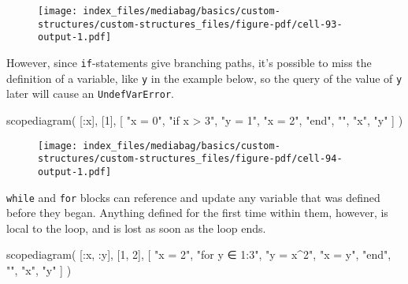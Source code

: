 \documentclass[
  letterpaper,
  DIV=11,
  numbers=noendperiod]{scrreprt}
\newenvironment{Shaded}{\begin{snugshade}}{\end{snugshade}}
\newcommand{\FloatTok}[1]{\textcolor[rgb]{0.68,0.00,0.00}{#1}}
\newcommand{\FunctionTok}[1]{\textcolor[rgb]{0.28,0.35,0.67}{#1}}
\newcommand{\NormalTok}[1]{\textcolor[rgb]{0.00,0.23,0.31}{#1}}
\newcommand{\OperatorTok}[1]{\textcolor[rgb]{0.37,0.37,0.37}{#1}}
\newcommand{\StringTok}[1]{\textcolor[rgb]{0.13,0.47,0.30}{#1}}
\begin{document}
\begin{figure}[H]

{\centering \texttt{[image: index\_files/mediabag/basics/custom-structures/custom-structures\_files/figure-pdf/cell-93-output-1.pdf]}

}

\end{figure}

However, since \texttt{if}-statements give branching paths, it's
possible to miss the definition of a variable, like \texttt{y} in the
example below, so the query of the value of \texttt{y} later will cause
an \texttt{UndefVarError}.

\begin{Shaded}
\begin{Highlighting}[]
\FunctionTok{scopediagram}\NormalTok{(}
\NormalTok{    [}\OperatorTok{:}\NormalTok{x], [}\FloatTok{1}\NormalTok{],}
\NormalTok{    [}
        \StringTok{"x = 0"}\NormalTok{,}
        \StringTok{"if x \textgreater{} 3"}\NormalTok{,}
        \StringTok{"y = 1"}\NormalTok{,}
        \StringTok{"x = 2"}\NormalTok{,}
        \StringTok{"end"}\NormalTok{,}
        \StringTok{""}\NormalTok{,}
        \StringTok{"x"}\NormalTok{,}
        \StringTok{"y"}
\NormalTok{    ]}
\NormalTok{)}
\end{Highlighting}
\end{Shaded}

\begin{figure}[H]

{\centering \texttt{[image: index\_files/mediabag/basics/custom-structures/custom-structures\_files/figure-pdf/cell-94-output-1.pdf]}

}

\end{figure}

\texttt{while} and \texttt{for} blocks can reference and update any
variable that was defined before they began. Anything defined for the
first time within them, however, is local to the loop, and is lost as
soon as the loop ends.

\begin{Shaded}
\begin{Highlighting}[]
\FunctionTok{scopediagram}\NormalTok{(}
\NormalTok{    [}\OperatorTok{:}\NormalTok{x, }\OperatorTok{:}\NormalTok{y], [}\FloatTok{1}\NormalTok{, }\FloatTok{2}\NormalTok{],}
\NormalTok{    [}
        \StringTok{"x = 2"}\NormalTok{,}
        \StringTok{"for y ∈ 1:3"}\NormalTok{,}
        \StringTok{"y = x\^{}2"}\NormalTok{,}
        \StringTok{"x = y"}\NormalTok{,}
        \StringTok{"end"}\NormalTok{,}
        \StringTok{""}\NormalTok{,}
        \StringTok{"x"}\NormalTok{,}
        \StringTok{"y"}
\NormalTok{    ]}
\NormalTok{)}
\end{Highlighting}
\end{Shaded}
\end{document}
